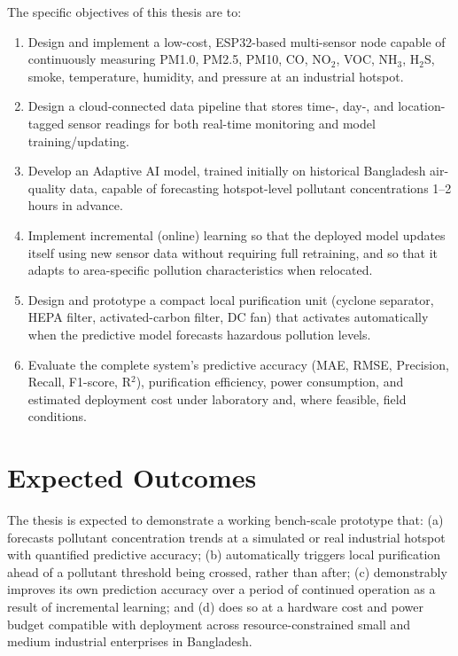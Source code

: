 The specific objectives of this thesis are to:

\begin{enumerate}
    \item Design and implement a low-cost, ESP32-based multi-sensor node capable of continuously measuring PM1.0, PM2.5, PM10, CO, NO$_2$, VOC, NH$_3$, H$_2$S, smoke, temperature, humidity, and pressure at an industrial hotspot.
    \item Design a cloud-connected data pipeline that stores time-, day-, and location-tagged sensor readings for both real-time monitoring and model training/updating.
    \item Develop an Adaptive AI model, trained initially on historical Bangladesh air-quality data, capable of forecasting hotspot-level pollutant concentrations 1--2 hours in advance.
    \item Implement incremental (online) learning so that the deployed model updates itself using new sensor data without requiring full retraining, and so that it adapts to area-specific pollution characteristics when relocated.
    \item Design and prototype a compact local purification unit (cyclone separator, HEPA filter, activated-carbon filter, DC fan) that activates automatically when the predictive model forecasts hazardous pollution levels.
    \item Evaluate the complete system's predictive accuracy (MAE, RMSE, Precision, Recall, F1-score, R$^2$), purification efficiency, power consumption, and estimated deployment cost under laboratory and, where feasible, field conditions.
\end{enumerate}

\section{Expected Outcomes}
\label{sec:expected-outcomes}

The thesis is expected to demonstrate a working bench-scale prototype that: (a) forecasts pollutant concentration trends at a simulated or real industrial hotspot with quantified predictive accuracy; (b) automatically triggers local purification ahead of a pollutant threshold being crossed, rather than after; (c) demonstrably improves its own prediction accuracy over a period of continued operation as a result of incremental learning; and (d) does so at a hardware cost and power budget compatible with deployment across resource-constrained small and medium industrial enterprises in Bangladesh. 

